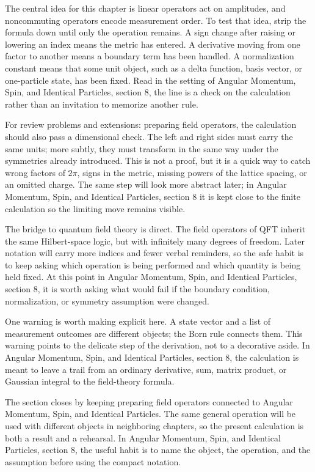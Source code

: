 The central idea for this chapter is linear operators act on amplitudes, and noncommuting operators encode measurement order.  To test that idea, strip the formula down until only the operation remains.  A sign change after raising or lowering an index means the metric has entered.  A derivative moving from one factor to another means a boundary term has been handled.  A normalization constant means that some unit object, such as a delta function, basis vector, or one-particle state, has been fixed.  Read in the setting of Angular Momentum, Spin, and Identical Particles, section 8, the line is a check on the calculation rather than an invitation to memorize another rule.

For review problems and extensions: preparing field operators, the calculation should also pass a dimensional check.  The left and right sides must carry the same units; more subtly, they must transform in the same way under the symmetries already introduced.  This is not a proof, but it is a quick way to catch wrong factors of \(2\pi\), signs in the metric, missing powers of the lattice spacing, or an omitted charge.  The same step will look more abstract later; in Angular Momentum, Spin, and Identical Particles, section 8 it is kept close to the finite calculation so the limiting move remains visible.

The bridge to quantum field theory is direct.  The field operators of QFT inherit the same Hilbert-space logic, but with infinitely many degrees of freedom.  Later notation will carry more indices and fewer verbal reminders, so the safe habit is to keep asking which operation is being performed and which quantity is being held fixed.  At this point in Angular Momentum, Spin, and Identical Particles, section 8, it is worth asking what would fail if the boundary condition, normalization, or symmetry assumption were changed.

One warning is worth making explicit here.  A state vector and a list of measurement outcomes are different objects; the Born rule connects them.  This warning points to the delicate step of the derivation, not to a decorative aside.  In Angular Momentum, Spin, and Identical Particles, section 8, the calculation is meant to leave a trail from an ordinary derivative, sum, matrix product, or Gaussian integral to the field-theory formula.

The section closes by keeping preparing field operators connected to Angular Momentum, Spin, and Identical Particles.  The same general operation will be used with different objects in neighboring chapters, so the present calculation is both a result and a rehearsal.  In Angular Momentum, Spin, and Identical Particles, section 8, the useful habit is to name the object, the operation, and the assumption before using the compact notation.



